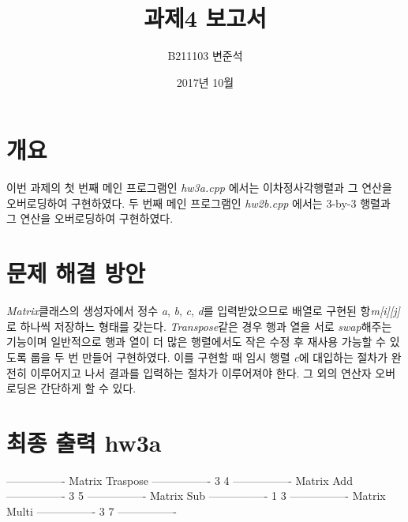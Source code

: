 \documentclass[a4paper,12pt]{article}
\begin{document}
 

\title{과제4 보고서}
\author{B211103 변준석}
\date{2017년 10월}
\maketitle

\newpage
\section{개요}
이번 과제의 첫 번째 메인 프로그램인 \textsl{hw3a.cpp} 에서는 이차정사각행렬과 그 연산을 오버로딩하여 구현하였다.
두 번째 메인 프로그램인 \textsl{hw2b.cpp} 에서는 3-by-3 행렬과 그 연산을 오버로딩하여 구현하였다.

\section{문제 해결 방안}
\textsl{Matrix}클래스의 생성자에서 정수 \textsl{a}, \textsl{b}, \textsl{c}, \textsl{d}를 입력받았으므로 배열로 구현된 항\textsl{m[i][j]}로 하나씩 저장하느 형태를 갖는다.
\textsl{Transpose}같은 경우 행과 열을 서로 \textsl{swap}해주는 기능이며 일반적으로 행과 열이 더 많은 행렬에서도 작은 수정 후 재사용 가능할 수 있도록 룹을 두 번  만들어 구현하였다.
이를 구현할 때 임시 행렬 \textsl{c}에 대입하는 절차가 완전히 이루어지고 나서 결과를 입력하는 절차가 이루어져야 한다.
그 외의 연산자 오버로딩은 간단하게 할 수 있다.

\section{최종 출력 hw3a}
----------------
\newline
Matrix Traspose
\newline
----------------
 3
 4
\newline
----------------
\newline
Matrix Add
\newline
----------------
 3
 5
\newline
----------------
\newline
Matrix Sub
\newline
----------------
 1
 3
\newline
----------------
\newline
Matrix Multi
\newline
----------------
 3
 7
\newline
----------------
\end{document}
